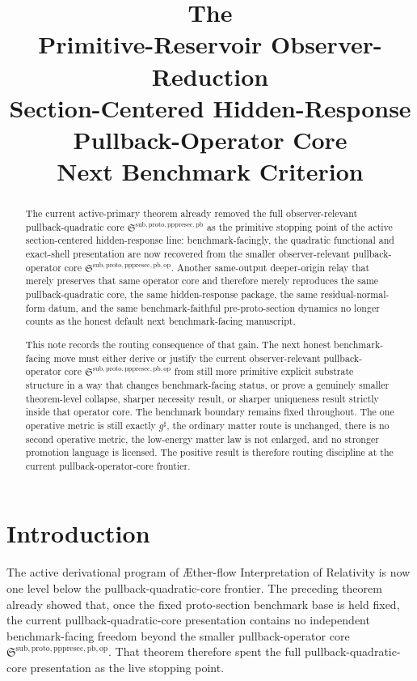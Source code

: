 \documentclass[11pt]{article}
\title{\textbf{The \TheoryName{}}\\[0.4em]
\large Primitive-Reservoir Observer-Reduction\\
\large Section-Centered Hidden-Response\\
\large Pullback-Operator Core\\
\large Next Benchmark Criterion}
\author{}
\date{}
\newcommand{\Aflow}{\AE{}ther-flow}
\newcommand{\TheoryName}{\Aflow{} Interpretation of Relativity}
\newcommand{\CompletedMetric}{g^{\sharp}}
\newcommand{\PrePreProtoSectionPullbackCore}{\mathfrak S^{\mathrm{sub,proto,pppresec,pb}}}
\newcommand{\PullbackOperatorCore}{\mathfrak S^{\mathrm{sub,proto,pppresec,pb,op}}}
\begin{document}
\maketitle

\begin{abstract}
The current active-primary theorem already removed the full observer-relevant pullback-quadratic core \(\PrePreProtoSectionPullbackCore\) as the primitive stopping point of the active section-centered hidden-response line: benchmark-facingly, the quadratic functional and exact-shell presentation are now recovered from the smaller observer-relevant pullback-operator core \(\PullbackOperatorCore\). Another same-output deeper-origin relay that merely preserves that same operator core and therefore merely reproduces the same pullback-quadratic core, the same hidden-response package, the same residual-normal-form datum, and the same benchmark-faithful pre-proto-section dynamics no longer counts as the honest default next benchmark-facing manuscript.

This note records the routing consequence of that gain. The next honest benchmark-facing move must either derive or justify the current observer-relevant pullback-operator core \(\PullbackOperatorCore\) from still more primitive explicit substrate structure in a way that changes benchmark-facing status, or prove a genuinely smaller theorem-level collapse, sharper necessity result, or sharper uniqueness result strictly inside that operator core. The benchmark boundary remains fixed throughout. The one operative metric is still exactly \(\CompletedMetric\), the ordinary matter route is unchanged, there is no second operative metric, the low-energy matter law is not enlarged, and no stronger promotion language is licensed. The positive result is therefore routing discipline at the current pullback-operator-core frontier.
\end{abstract}

\section{Introduction}

The active derivational program of \TheoryName{} is now one level below the pullback-quadratic-core frontier. The preceding theorem already showed that, once the fixed proto-section benchmark base is held fixed, the current pullback-quadratic-core presentation contains no independent benchmark-facing freedom beyond the smaller pullback-operator core \(\PullbackOperatorCore\). That theorem therefore spent the full pullback-quadratic-core presentation as the live stopping point.
\end{document}
